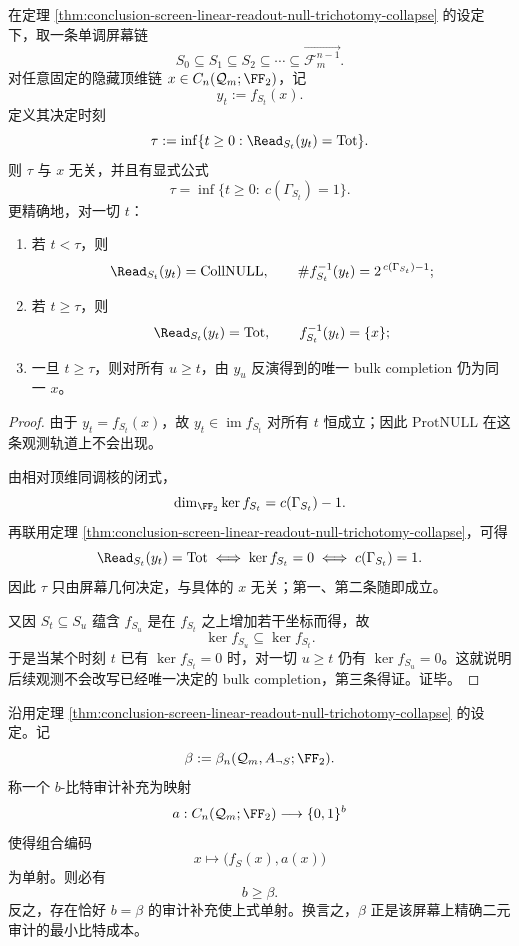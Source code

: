 \begin{theorem}[延迟观测的几何决定时刻]\label{thm:conclusion-screen-delayed-observation-geometric-decision-time}
在定理 \ref{thm:conclusion-screen-linear-readout-null-trichotomy-collapse} 的设定下，取一条单调屏幕链
\[
S_0\subseteq S_1\subseteq S_2\subseteq \cdots \subseteq \overrightarrow{\mathcal F_m^{n-1}}.
\]
对任意固定的隐藏顶维链 \(x\in C_n(\mathcal Q_m;\FF_2)\)，记
\[
y_t:=f_{S_t}(x).
\]
定义其决定时刻
\[
\tau:=\inf\{t\ge 0:\Read_{S_t}(y_t)=\mathrm{Tot}\}.
\]
则 \(\tau\) 与 \(x\) 无关，并且有显式公式
\[
\tau=\inf\{t\ge 0:\ c(\Gamma_{S_t})=1\}.
\]
更精确地，对一切 \(t\)：
\begin{enumerate}
  \item 若 \(t<\tau\)，则
        \[
        \Read_{S_t}(y_t)=\mathrm{CollNULL},
        \qquad
        \#f_{S_t}^{-1}(y_t)=2^{\,c(\Gamma_{S_t})-1};
        \]
  \item 若 \(t\ge \tau\)，则
        \[
        \Read_{S_t}(y_t)=\mathrm{Tot},
        \qquad
        f_{S_t}^{-1}(y_t)=\{x\};
        \]
  \item 一旦 \(t\ge \tau\)，则对所有 \(u\ge t\)，由 \(y_u\) 反演得到的唯一 bulk completion 仍为同一 \(x\)。
\end{enumerate}
\end{theorem}

\begin{proof}
由于 \(y_t=f_{S_t}(x)\)，故 \(y_t\in \operatorname{im}f_{S_t}\) 对所有 \(t\) 恒成立；因此 \(\mathrm{ProtNULL}\) 在这条观测轨道上不会出现。

由相对顶维同调核的闭式，
\[
\dim_{\FF_2}\ker f_{S_t}=c(\Gamma_{S_t})-1.
\]
再联用定理 \ref{thm:conclusion-screen-linear-readout-null-trichotomy-collapse}，可得
\[
\Read_{S_t}(y_t)=\mathrm{Tot}
\iff
\ker f_{S_t}=0
\iff
c(\Gamma_{S_t})=1.
\]
因此 \(\tau\) 只由屏幕几何决定，与具体的 \(x\) 无关；第一、第二条随即成立。

又因 \(S_t\subseteq S_u\) 蕴含 \(f_{S_u}\) 是在 \(f_{S_t}\) 之上增加若干坐标而得，故
\[
\ker f_{S_u}\subseteq \ker f_{S_t}.
\]
于是当某个时刻 \(t\) 已有 \(\ker f_{S_t}=0\) 时，对一切 \(u\ge t\) 仍有 \(\ker f_{S_u}=0\)。这就说明后续观测不会改写已经唯一决定的 bulk completion，第三条得证。证毕。
\end{proof}

\begin{theorem}[精确二元审计的同调比特下界]\label{thm:conclusion-screen-exact-binary-audit-homological-bit-bound}
沿用定理 \ref{thm:conclusion-screen-linear-readout-null-trichotomy-collapse} 的设定。记
\[
\beta:=\beta_n(\mathcal Q_m,A_{\neg S};\FF_2).
\]
称一个 \(b\)-比特审计补充为映射
\[
a:C_n(\mathcal Q_m;\FF_2)\longrightarrow \{0,1\}^b
\]
使得组合编码
\[
x\longmapsto \bigl(f_S(x),a(x)\bigr)
\]
为单射。则必有
\[
b\ge \beta.
\]
反之，存在恰好 \(b=\beta\) 的审计补充使上式单射。换言之，\(\beta\) 正是该屏幕上精确二元审计的最小比特成本。
\end{theorem}

